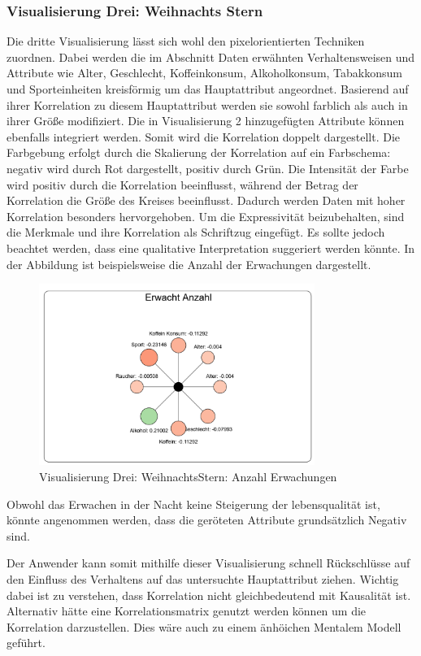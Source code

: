 \documentclass[usegeometry=true]{scrartcl}
\begin{document}
\subsubsection{Visualisierung Drei: Weihnachts Stern} 
Die dritte Visualisierung lässt sich wohl den pixelorientierten Techniken zuordnen. Dabei werden die im Abschnitt Daten erwähnten Verhaltensweisen und Attribute wie Alter, Geschlecht, Koffeinkonsum, Alkoholkonsum, Tabakkonsum und Sporteinheiten kreisförmig um das Hauptattribut angeordnet. Basierend auf ihrer Korrelation zu diesem Hauptattribut werden sie sowohl farblich als auch in ihrer Größe modifiziert. Die in Visualisierung 2 hinzugefügten Attribute können ebenfalls integriert werden. Somit wird die Korrelation doppelt dargestellt. Die Farbgebung erfolgt durch die Skalierung der Korrelation auf ein Farbschema: negativ wird durch Rot dargestellt, positiv durch Grün. Die Intensität der Farbe wird positiv durch die Korrelation beeinflusst, während der Betrag der Korrelation die Größe des Kreises beeinflusst. Dadurch werden Daten mit hoher Korrelation besonders hervorgehoben. Um die Expressivität beizubehalten, sind die Merkmale und ihre Korrelation als Schriftzug eingefügt. Es sollte jedoch beachtet werden, dass eine qualitative Interpretation suggeriert werden könnte. In der Abbildung ist beispielsweise die Anzahl der Erwachungen dargestellt.

\begin{figure}[h]
  \centering
  \includegraphics[width = 0.8\textwidth]{WeihnachtsStern.JPG}
  \caption{Visualisierung Drei: WeihnachtsStern: Anzahl Erwachungen }
\end{figure}

Obwohl das Erwachen in der Nacht keine Steigerung der lebensqualität ist, könnte angenommen werden, dass die geröteten Attribute grundsätzlich Negativ sind.

Der Anwender kann somit mithilfe dieser Visualisierung schnell Rückschlüsse auf den Einfluss des Verhaltens auf das untersuchte Hauptattribut ziehen. Wichtig dabei ist zu verstehen, dass Korrelation nicht gleichbedeutend mit Kausalität ist.
Alternativ hätte eine Korrelationsmatrix genutzt werden können um die Korrelation darzustellen. Dies wäre auch zu einem änhöichen Mentalem Modell geführt.
\end{document}
